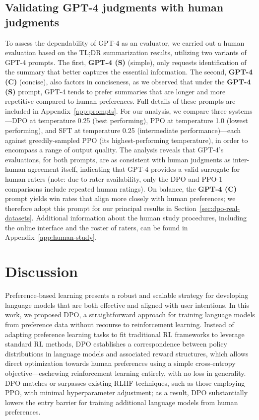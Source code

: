 \subsection{Validating GPT-4 judgments with human judgments}
\label{sec:human-judgments}
To assess the dependability of GPT-4 as an evaluator, we carried out a human evaluation based on the TL;DR summarization results, utilizing two variants of GPT-4 prompts. The first, \textbf{GPT-4 (S)} (simple), only requests identification of the summary that better captures the essential information. The second, \textbf{GPT-4 (C)} (concise), also factors in conciseness, as we observed that under the \textbf{GPT-4 (S)} prompt, GPT-4 tends to prefer summaries that are longer and more repetitive compared to human preferences. Full details of these prompts are included in Appendix~\ref{app:prompts}. For our analysis, we compare three systems—DPO at temperature 0.25 (best performing), PPO at temperature 1.0 (lowest performing), and SFT at temperature 0.25 (intermediate performance)—each against greedily-sampled PPO (its highest-performing temperature), in order to encompass a range of output quality. The analysis reveals that GPT-4's evaluations, for both prompts, are as consistent with human judgments as inter-human agreement itself, indicating that GPT-4 provides a valid surrogate for human raters (note: due to rater availability, only the DPO and PPO-1 comparisons include repeated human ratings). On balance, the \textbf{GPT-4 (C)} prompt yields win rates that align more closely with human preferences; we therefore adopt this prompt for our principal results in Section~\ref{sec:dpo-real-datasets}. Additional information about the human study procedures, including the online interface and the roster of raters, can be found in Appendix~\ref{app:human-study}.

\section{Discussion}
Preference-based learning presents a robust and scalable strategy for developing language models that are both effective and aligned with user intentions. In this work, we proposed DPO, a straightforward approach for training language models from preference data without recourse to reinforcement learning. Instead of adapting preference learning tasks to fit traditional RL frameworks to leverage standard RL methods, DPO establishes a correspondence between policy distributions in language models and associated reward structures, which allows direct optimization towards human preferences using a simple cross-entropy objective—eschewing reinforcement learning entirely, with no loss in generality. DPO matches or surpasses existing RLHF techniques, such as those employing PPO, with minimal hyperparameter adjustment; as a result, DPO substantially lowers the entry barrier for training additional language models from human preferences.

